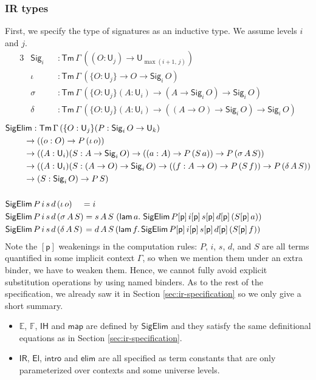 \documentclass[acmsmall,screen,review,anonymous]{acmart}
\newcommand{\msf}[1]{{\mathsf{#1}}}
\newcommand{\mbb}[1]{\mathbb{#1}}
\newcommand{\p}{\mathsf{p}}
\newcommand{\U}{\msf{U}}
\newcommand{\El}{\msf{El}}
\newcommand{\Sig}{\msf{Sig}}
\newcommand{\IR}{\msf{IR}}
\newcommand{\intro}{\msf{intro}}
\newcommand{\IH}{\msf{IH}}
\newcommand{\map}{\msf{map}}
\newcommand{\elim}{\msf{elim}}
\newcommand{\Tm}{\msf{Tm}}
\newcommand{\lam}{\msf{lam}}
\newcommand{\SigElim}{\msf{SigElim}}
\newcommand{\E}{\mbb{E}}
\newcommand{\F}{\mbb{F}}
\begin{document}
\subsubsection{IR types} First, we specify the type of signatures as an inductive type. We assume levels $i$
and $j$.
\begin{alignat*}{3}
  &\Sig_i  &&: \Tm\,\Gamma\,((O : \U_j) \to \U_{\max(i+1,\,j)})\\
  &\iota   &&: \Tm\,\Gamma\,(\{O : \U_j\} \to O \to \Sig_i\,O)\\
  &\sigma  &&: \Tm\,\Gamma\,(\{O : \U_j\}(A : \U_i) \to (A \to \Sig_i\,O) \to \Sig_i\,O)\\
  &\delta  &&: \Tm\,\Gamma\,(\{O : \U_j\}(A : \U_i) \to ((A \to O) \to \Sig_i\,O) \to \Sig_i\,O)
\end{alignat*}
\begin{alignat*}{3}
  &\SigElim : \Tm\,\Gamma\,(\{O : \U_j\}(P : \Sig_i\,O \to \U_k)\\
  &           \hspace{2.2em}\to ((o : O) \to P\,(\iota\,o))\\
  &           \hspace{2.2em}\to ((A : \U_i)(S : A \to \Sig_i\,O) \to ((a : A) \to P\,(S\,a)) \to P\,(\sigma\,A\,S))\\
  &           \hspace{2.2em}\to ((A : \U_i)(S : (A \to O) \to \Sig_i\,O) \to ((f : A \to O) \to P\,(S\,f)) \to P\,(\delta\,A\,S))\\
  &           \hspace{2.2em}\to (S : \Sig_i\,O) \to P\,S)\\
  &\\
  &\SigElim\,P\,i\,s\,d\,(\iota\,o) \hspace{1.1em} = i\\
  &\SigElim\,P\,i\,s\,d\,(\sigma\,A\,S) = s\,A\,S\hspace{0.3em}(\lam\,a.\hspace{0.3em}\SigElim\,P[\p]\,i[\p]\,s[\p]\,d[\p]\,(S[\p]\,a))\\
  &\SigElim\,P\,i\,s\,d\,(\delta\,A\,S) \hspace{0.1em}= d\,A\,S\,(\lam\,f.\,\SigElim\,P[\p]\,i[\p]\,s[\p]\,d[\p]\,(S[\p]\,f))
\end{alignat*}
Note the $[\p]$ weakenings in the computation rules: $P$, $i$, $s$, $d$, and $S$ are all terms
quantified in some implicit context $\Gamma$, so when we mention them under an extra binder, we have
to weaken them. Hence, we cannot fully avoid explicit substitution operations by using named
binders. As to the rest of the specification, we already saw it in Section
\ref{sec:ir-specification} so we only give a short summary.
\begin{itemize}
\item $\E$, $\F$, $\IH$ and $\map$ are defined by $\SigElim$ and they satisfy the same definitional
  equations as in Section \ref{sec:ir-specification}.
\item $\IR$, $\El$, $\intro$ and $\elim$ are all specified as term constants that are only parameterized over contexts and some universe levels.
\end{itemize}
\end{document}
